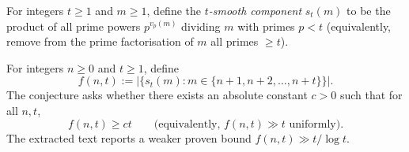 For integers $t\ge 1$ and $m\ge 1$, define the \emph{$t$-smooth component} $s_t(m)$ to be the product of all prime powers $p^{v_p(m)}$ dividing $m$ with primes $p<t$ (equivalently, remove from the prime factorisation of $m$ all primes $\ge t$).

For integers $n\ge 0$ and $t\ge 1$, define
\[f(n,t):=\left|\{s_t(m): m\in\{n+1,n+2,\dots,n+t\}\}\right|.
\]
The conjecture asks whether there exists an absolute constant $c>0$ such that for all $n,t$,
\[f(n,t)\ge c t\qquad\text{(equivalently, }f(n,t)\gg t\text{ uniformly).}
\]
The extracted text reports a weaker proven bound $f(n,t)\gg t/\log t$.
